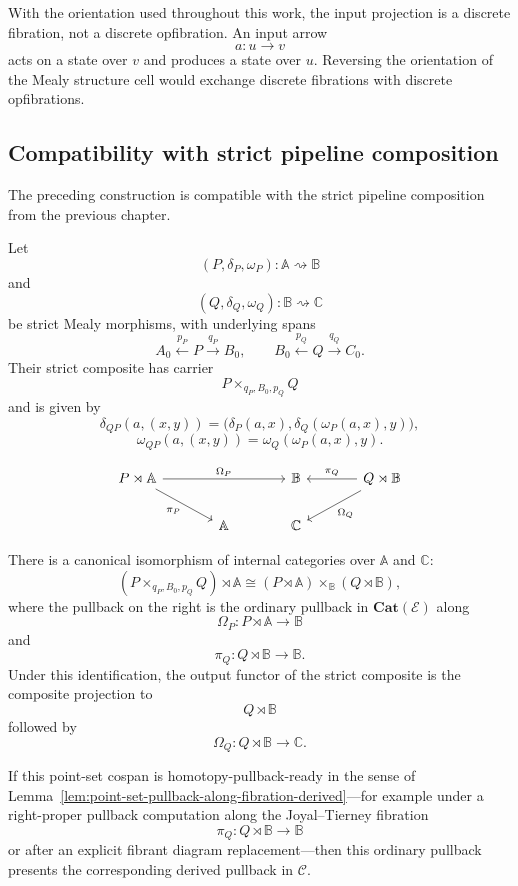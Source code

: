\begin{remark}
\label{rem:discrete-fibration-not-opfibration-derived-rewritten}
With the orientation used throughout this work, the input projection is
a discrete fibration, not a discrete opfibration. An input arrow
\[
a:u\to v
\]
acts on a state over \(v\) and produces a state over \(u\). Reversing the
orientation of the Mealy structure cell would exchange discrete
fibrations with discrete opfibrations.
\end{remark}

\subsection{Compatibility with strict pipeline composition}
\label{subsec:strict-pipeline-derived-compatibility-rewritten}

The preceding construction is compatible with the strict pipeline
composition from the previous chapter.

Let
\[
(P,\delta_P,\omega_P):\mathbb A\rightsquigarrow\mathbb B
\]
and
\[
(Q,\delta_Q,\omega_Q):\mathbb B\rightsquigarrow\mathbb C
\]
be strict Mealy morphisms, with underlying spans
\[
A_0\xleftarrow{p_P}P\xrightarrow{q_P}B_0,
\qquad
B_0\xleftarrow{p_Q}Q\xrightarrow{q_Q}C_0.
\]
Their strict composite has carrier
\[
P\times_{q_P,B_0,p_Q}Q
\]
and is given by
\[
\delta_{QP}(a,(x,y))
=
\bigl(
\delta_P(a,x),
\delta_Q(\omega_P(a,x),y)
\bigr),
\]
\[
\omega_{QP}(a,(x,y))
=
\omega_Q(\omega_P(a,x),y).
\]

\[
\begin{tikzcd}[column sep=large]
P\rtimes\mathbb A
\arrow[rr, "\Omega_P"]
\arrow[dr, "\pi_P"']
&
&
\mathbb B
&
Q\rtimes\mathbb B
\arrow[l, "\pi_Q"']
\arrow[dl, "\Omega_Q"]
\\
&
\mathbb A
&
\mathbb C
&
\end{tikzcd}
\]

\begin{proposition}
\label{prop:strict-pipeline-as-pullback-action-categories-rewritten}
There is a canonical isomorphism of internal categories over
\(\mathbb A\) and \(\mathbb C\):
\[
(P\times_{q_P,B_0,p_Q}Q)\rtimes\mathbb A
\cong
(P\rtimes\mathbb A)
\times_{\mathbb B}
(Q\rtimes\mathbb B),
\]
where the pullback on the right is the ordinary pullback in
\(\mathbf{Cat}(\mathcal E)\) along
\[
\Omega_P:P\rtimes\mathbb A\to\mathbb B
\]
and
\[
\pi_Q:Q\rtimes\mathbb B\to\mathbb B.
\]
Under this identification, the output functor of the strict composite is
the composite projection to
\[
Q\rtimes\mathbb B
\]
followed by
\[
\Omega_Q:Q\rtimes\mathbb B\to\mathbb C.
\]

If this point-set cospan is homotopy-pullback-ready in the sense of
Lemma~\ref{lem:point-set-pullback-along-fibration-derived}---for
example under a right-proper pullback computation along the
Joyal--Tierney fibration
\[
\pi_Q:Q\rtimes\mathbb B\to\mathbb B
\]
or after an explicit fibrant diagram replacement---then this ordinary
pullback presents the corresponding derived pullback in \(\mathcal C\).
\end{proposition}


